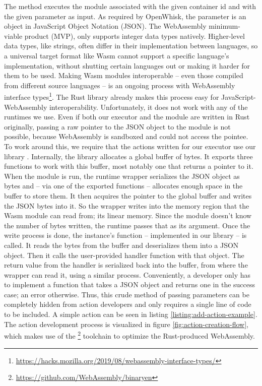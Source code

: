 The  method executes the module associated with the given container id and with the given parameter as input. As required by OpenWhisk, the parameter is an object in JavaScript Object Notation (JSON). The WebAssembly minimum-viable product (MVP), only supports integer data types natively. Higher-level data types, like strings, often differ in their implementation between languages, so a universal target format like Wasm cannot support a specific language's implementation, without shutting certain languages out or making it harder for them to be used. Making Wasm modules interoperable -- even those compiled from different source languages -- is an ongoing process with WebAssembly interface types\footnote{\url{https://hacks.mozilla.org/2019/08/webassembly-interface-types/}}. The  Rust library already makes this process easy for JavaScript-WebAssembly interoperability. Unfortunately, it does not work with any of the runtimes we use. Even if both our executor and the module are written in Rust originally, passing a raw pointer to the JSON object to the module is not possible, because WebAssembly is sandboxed and could not access the pointee. To work around this, we require that the actions written for our executor use our library . Internally, the library allocates a global buffer of bytes. It exports three functions to work with this buffer, most notably one that returns a pointer to it. When the module is run, the runtime wrapper serializes the JSON object as bytes and -- via one of the exported functions -- allocates enough space in the buffer to store them. It then acquires the pointer to the global buffer and writes the JSON bytes into it. So the wrapper writes into the memory region that the Wasm module can read from; its linear memory. Since the module doesn't know the number of bytes written, the runtime passes that as its  argument.
Once the write process is done, the instance's  function -- implemented in our library -- is called. It reads the  bytes from the buffer and deserializes them into a JSON object. Then it calls the user-provided handler function with that object. The return value from the handler is serialized back into the buffer, from where the wrapper can read it, using a similar process.
Conveniently, a developer only has to implement a function that takes a JSON object and returns one in the success case; an error otherwise. Thus, this crude method of passing parameters can be completely hidden from action developers and only requires a single line of code to be included. A simple action can be seen in listing \ref{listing:add-action-example}. The action development process is visualized in figure \ref{fig:action-creation-flow}, which makes use of the \footnote{\url{https://github.com/WebAssembly/binaryen}} toolchain to optimize the Rust-produced WebAssembly.
